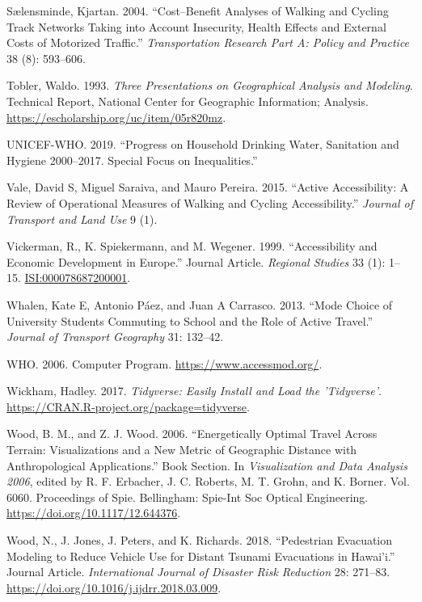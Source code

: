 \documentclass[]{elsarticle} %
\begin{document}
\leavevmode\hypertarget{ref-Saelensminde2004cost}{}%
Sælensminde, Kjartan. 2004. ``Cost--Benefit Analyses of Walking and
Cycling Track Networks Taking into Account Insecurity, Health Effects
and External Costs of Motorized Traffic.'' \emph{Transportation Research
Part A: Policy and Practice} 38 (8): 593--606.

\leavevmode\hypertarget{ref-Tobler1993three}{}%
Tobler, Waldo. 1993. \emph{Three Presentations on Geographical Analysis
and Modeling}. Technical Report, National Center for Geographic
Information; Analysis. \url{https://escholarship.org/uc/item/05r820mz}.

\leavevmode\hypertarget{ref-world2019progress}{}%
UNICEF-WHO. 2019. ``Progress on Household Drinking Water, Sanitation and
Hygiene 2000--2017. Special Focus on Inequalities.''

\leavevmode\hypertarget{ref-vale2015}{}%
Vale, David S, Miguel Saraiva, and Mauro Pereira. 2015. ``Active
Accessibility: A Review of Operational Measures of Walking and Cycling
Accessibility.'' \emph{Journal of Transport and Land Use} 9 (1).

\leavevmode\hypertarget{ref-Vickerman1999accessibility}{}%
Vickerman, R., K. Spiekermann, and M. Wegener. 1999. ``Accessibility and
Economic Development in Europe.'' Journal Article. \emph{Regional
Studies} 33 (1): 1--15. \url{ISI:000078687200001}.

\leavevmode\hypertarget{ref-Whalen2013mode}{}%
Whalen, Kate E, Antonio Páez, and Juan A Carrasco. 2013. ``Mode Choice
of University Students Commuting to School and the Role of Active
Travel.'' \emph{Journal of Transport Geography} 31: 132--42.

\leavevmode\hypertarget{ref-AccessMod}{}%
WHO. 2006. Computer Program. \url{https://www.accessmod.org/}.

\leavevmode\hypertarget{ref-Wickham2017}{}%
Wickham, Hadley. 2017. \emph{Tidyverse: Easily Install and Load the
'Tidyverse'}. \url{https://CRAN.R-project.org/package=tidyverse}.

\leavevmode\hypertarget{ref-Wood2006}{}%
Wood, B. M., and Z. J. Wood. 2006. ``Energetically Optimal Travel Across
Terrain: Visualizations and a New Metric of Geographic Distance with
Anthropological Applications.'' Book Section. In \emph{Visualization and
Data Analysis 2006}, edited by R. F. Erbacher, J. C. Roberts, M. T.
Grohn, and K. Borner. Vol. 6060. Proceedings of Spie. Bellingham:
Spie-Int Soc Optical Engineering.
\url{https://doi.org/10.1117/12.644376}.

\leavevmode\hypertarget{ref-Wood2018}{}%
Wood, N., J. Jones, J. Peters, and K. Richards. 2018. ``Pedestrian
Evacuation Modeling to Reduce Vehicle Use for Distant Tsunami
Evacuations in Hawai'i.'' Journal Article. \emph{International Journal
of Disaster Risk Reduction} 28: 271--83.
\url{https://doi.org/10.1016/j.ijdrr.2018.03.009}.
\end{document}
